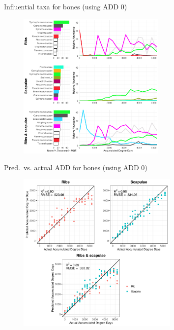 \documentclass{beamer}
\begin{document}
\begin{frame}{Influential taxa for bones (using ADD 0)}

  \begin{center}
    \begin{figure}
      \includegraphics[height=2.85in]
        {w_bones/bacteria/use_families/hl_combined_family_w_baseline_6panels}
    \end{figure}
  \end{center}

\end{frame}



\begin{frame}{Pred.\ vs. actual ADD for bones (using ADD 0)}

  \begin{center}
    \begin{figure}
      \includegraphics[height=3.1in]
        {w_bones/bacteria/use_families/hl_combined_family_w_baseline_predicted_vs_actual_ADD}
    \end{figure}
  \end{center}
    
\end{frame}
\end{document}
